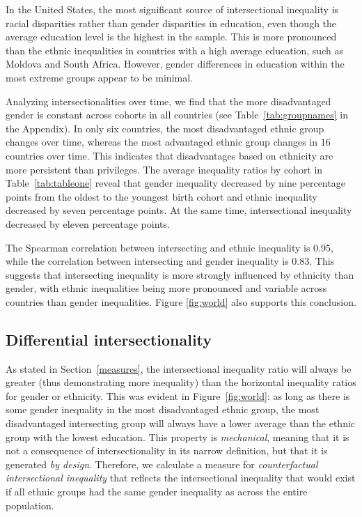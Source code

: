 In the United States, the most significant source of intersectional inequality is racial disparities rather than gender disparities in education, even though the average education level is the highest in the sample. This is more pronounced than the ethnic inequalities in countries with a high average education, such as Moldova and South Africa. However, gender differences in education within the most extreme groups appear to be minimal.

Analyzing intersectionalities over time, we find that the more disadvantaged gender is constant across cohorts in all countries (see Table~\ref{tab:groupnames} in the Appendix). In only six countries, the most disadvantaged ethnic group changes over time, whereas the most advantaged ethnic group changes in 16 countries over time. This indicates that disadvantages based on ethnicity are more persistent than privileges. The average inequality ratios by cohort in Table~\ref{tab:tableone} reveal that gender inequality decreased by nine percentage points from the oldest to the youngest birth cohort and ethnic inequality decreased by seven percentage points. At the same time, intersectional inequality decreased by eleven percentage points. 

The Spearman correlation between intersecting and ethnic inequality is 0.95, while the correlation between intersecting and gender inequality is 0.83. This suggests that intersecting inequality is more strongly influenced by ethnicity than gender, with ethnic inequalities being more pronounced and variable across countries than gender inequalities. Figure \ref{fig:world} also supports this conclusion.

\hypertarget{differential-intersectionality}{%
\subsection{Differential intersectionality}\label{differential-intersectionality}}

As stated in Section~\ref{measures}, the intersectional inequality ratio will always be greater (thus demonstrating more inequality) than the horizontal inequality ratios for gender or ethnicity. This was evident in Figure~\ref{fig:world}: as long as there is some gender inequality in the most disadvantaged ethnic group, the most disadvantaged intersecting group will always have a lower average than the ethnic group with the lowest education. This property is \emph{mechanical}, meaning that it is not a consequence of intersectionality in its narrow definition, but that it is generated \textit{by design}. Therefore, we calculate a measure for \emph{counterfactual intersectional inequality} that reflects the intersectional inequality that would exist if all ethnic groups had the same gender inequality as across the entire population.

